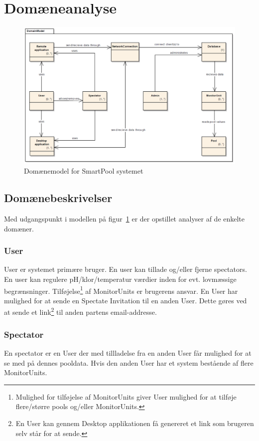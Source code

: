 \section{Domæneanalyse}

\begin{figure}
\centering
\includegraphics[width=\linewidth]{figs/domainModel}
\caption{Domænemodel for SmartPool systemet}
\label{fig:domainModel}
\end{figure}

\subsection{Domænebeskrivelser}
Med udgangspunkt i modellen på figur~\ref{fig:domainModel} er der opstillet analyser af de enkelte domæner.

\subsubsection{User}
User er systemet primære bruger. En user kan tillade og/eller fjerne spectators. En user kan regulere pH/klor/temperatur værdier inden for evt. lovmæssige begrænsninger. Tilføjelse\footnote{Mulighed for tilføjelse af  MonitorUnits giver User mulighed for at tilføje flere/større pools og/eller MonitorUnits.} af MonitorUnits er brugerens ansvar. En User har mulighed for at sende en Spectate Invitation til en anden User. Dette gøres ved at sende et link\footnote{En User kan gennem Desktop applikationen få genereret et link som brugeren selv står for at sende.}  til anden partens email-addresse.

\subsubsection{Spectator}
En spectator er en User der med tillladelse fra en anden User får mulighed for at se med på dennes pooldata. Hvis den anden User har et system bestående af flere MonitorUnits.

